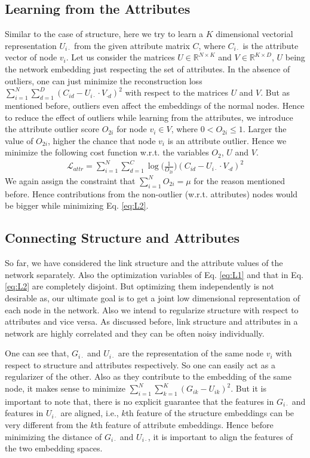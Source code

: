 \documentclass[letterpaper]{article} %
\begin{document}
\subsection{Learning from the Attributes}
Similar to the case of structure, here we try to learn a $K$ dimensional vectorial representation $U_{i\cdot}$ from the given attribute matrix $C$, where $C_{i\cdot}$ is the attribute vector of node $v_i$. Let us consider the matrices $U \in \mathbb{R}^{N \times K}$ and $V \in \mathbb{R}^{K \times D}$, $U$ being the network embedding just respecting the set of attributes. In the absence of outliers, one can just minimize the reconstruction loss $\sum\limits_{i=1}^N\sum\limits_{d=1}^D (C_{id} - U_{i\cdot} \cdot V_{\cdot d})^2$ with respect to the matrices $U$ and $V$. But as mentioned before, outliers even affect the embeddings of the normal nodes. Hence to reduce the effect of outliers while learning from the attributes, we introduce the attribute outlier score $O_{2i}$ for node $v_i \in V$, where $0 < O_{2i} \leq 1$. Larger the value of $O_{2i}$, higher the chance that node $v_i$ is an attribute outlier. Hence we minimize the following cost function w.r.t. the variables $O_2$, $U$ and $V$.
\begin{align}\label{eq:L2}
\mathcal{L}_{attr} = \sum_{i=1}^N\sum_{d=1}^C\log\Big({\frac{1}{O_{2i}}}\Big) (C_{id} - U_{i \cdot} \cdot V_{\cdot d})^2
\end{align}
We again assign the constraint that $\sum\limits_{i=1}^N O_{2i} = \mu$ for the reason mentioned before. Hence contributions from the non-outlier (w.r.t. attributes) nodes would be bigger while minimizing Eq. \ref{eq:L2}.

\subsection{Connecting Structure and Attributes}
So far, we have considered the link structure and the attribute values of the 
network separately. Also the optimization variables of Eq. \ref{eq:L1} and that in Eq. \ref{eq:L2} are completely disjoint. But optimizing them independently is not desirable as, our ultimate goal is to get a joint low dimensional representation of each node in the network. Also we intend to regularize structure with respect to attributes and vice versa. As discussed before, link structure and attributes in a network are highly correlated and they can be often noisy individually.

One can see that, $G_{i \cdot}$ and $U_{i \cdot}$ are the representation of the same node $v_i$ with respect to structure and attributes respectively. So one can easily act as a regularizer of the other. Also as they contribute to the embedding of the same node, it makes sense to minimize $\sum\limits_{i=1}^N \sum\limits_{k=1}^K (G_{ik} - U_{ik})^2$. But it is important to note that, there is no explicit guarantee that the features in $G_{i \cdot}$ and features in $U_{i \cdot}$ are aligned, i.e., $k$th feature of the structure embeddings can be very different from the $k$th feature of attribute embeddings. Hence before minimizing the distance of $G_{i \cdot}$ and $U_{i \cdot}$, it is important to align the features of the two embedding spaces.
\end{document}
